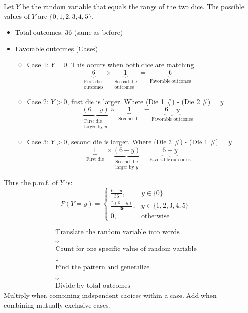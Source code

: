 ﻿\documentclass[12pt]{article}
\begin{document}
\begin{enumerate}
    Let $Y$ be the random variable that equals the range of the two dice. The possible values of $Y$ are $\{0,1,2,3,4,5\}$.
    \begin{itemize}
        \item Total outcomes: $36$ (same as before)
        \item Favorable outcomes (Cases)
        \begin{itemize}
            \item Case 1: $Y=0$. This occurs when both dice are matching.
    \[
\underbrace{6}_{\substack{\text{First die}\\\text{outcomes}}}
\times
\underbrace{1}_{\substack{\text{Second die}\\\text{outcomes}}}
=\underbrace{6}_{\substack{\text{Favorable outcomes}}}
\]
            \item Case 2: $Y>0$, first die is larger. Where (Die 1 \#) - (Die 2 \#) = $y$
                \[
\underbrace{(6-y)}_{\substack{\text{First die}\\\text{larger by }y}}
\times
\underbrace{1}_{\substack{\text{Second die}}}
=
\underbrace{6-y}_{\text{Favorable outcomes}}
\]
            \item Case 3: $Y>0$, second die is larger. Where (Die 2 \#) - (Die 1 \#) = $y$
             \[
\underbrace{1}_{\substack{\text{First die}}}
\times
\underbrace{(6-y)}_{\substack{\text{Second die}\\\text{larger by }y}}
=
\underbrace{6-y}_{\text{Favorable outcomes}}
\]
    \end{itemize}
\end{itemize}
Thus the p.m.f. of $Y$ is:
\[
P(Y=y)=
\begin{cases}
\displaystyle \frac{6-y}{36}, & y\in\{0\}\\[8pt]
\frac{2(6-y)}{36}, & y\in\{1,2,3,4,5\}\\[8pt]
0, & \text{otherwise}
\end{cases}
\]
\end{enumerate} 
\begin{notebox}
    \[
\begin{gathered}
\text{Translate the random variable into words}\\
\downarrow\\
\text{Count for one specific value of random variable}\\
\downarrow\\
\text{Find the pattern and generalize}\\
\downarrow\\
\text{Divide by total outcomes}
\end{gathered}
\]
Multiply when combining independent choices within a case. Add when combining mutually exclusive cases.
\end{notebox}
\end{document}
